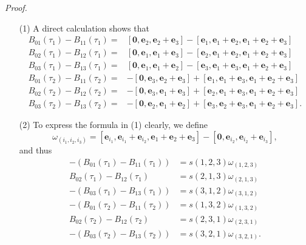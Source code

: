 \documentclass{article}
\begin{document}
\emph{Proof.}
\begin{enumerate}
\item[(1)]
  A direct calculation shows that
  \begin{align*}
    B_{01}(\tau_1) - B_{11}(\tau_1)
    =&
    [\mathbf{0}, \mathbf{e}_2, \mathbf{e}_2+\mathbf{e}_3]
      - [\mathbf{e}_1, \mathbf{e}_1+\mathbf{e}_2, \mathbf{e}_1+\mathbf{e}_2+\mathbf{e}_3] \\
    B_{02}(\tau_1) - B_{12}(\tau_1)
    =&
    [\mathbf{0}, \mathbf{e}_1, \mathbf{e}_1+\mathbf{e}_3]
      - [\mathbf{e}_2, \mathbf{e}_1+\mathbf{e}_2, \mathbf{e}_1+\mathbf{e}_2+\mathbf{e}_3] \\
    B_{03}(\tau_1) - B_{13}(\tau_1)
    =&
    [\mathbf{0}, \mathbf{e}_1, \mathbf{e}_1+\mathbf{e}_2]
      - [\mathbf{e}_3, \mathbf{e}_1+\mathbf{e}_3, \mathbf{e}_1+\mathbf{e}_2+\mathbf{e}_3] \\
    B_{01}(\tau_2) - B_{11}(\tau_2)
    =&
    -[\mathbf{0}, \mathbf{e}_3, \mathbf{e}_2+\mathbf{e}_3]
      + [\mathbf{e}_1, \mathbf{e}_1+\mathbf{e}_3, \mathbf{e}_1+\mathbf{e}_2+\mathbf{e}_3] \\
    B_{02}(\tau_2) - B_{12}(\tau_2)
    =& -[\mathbf{0}, \mathbf{e}_3, \mathbf{e}_1+\mathbf{e}_3]
      + [\mathbf{e}_2, \mathbf{e}_1+\mathbf{e}_3, \mathbf{e}_1+\mathbf{e}_2+\mathbf{e}_3] \\
    B_{03}(\tau_2) - B_{13}(\tau_2)
    =& -[\mathbf{0}, \mathbf{e}_2, \mathbf{e}_1+\mathbf{e}_2]
      + [\mathbf{e}_3, \mathbf{e}_2+\mathbf{e}_3, \mathbf{e}_1+\mathbf{e}_2+\mathbf{e}_3].
  \end{align*}

\item[(2)]
  To express the formula in (1) clearly, we define
  \[
    \omega_{(i_1,i_2,i_3)}
    =
    [
      \mathbf{e}_{i_1},
      \mathbf{e}_{i_1}+\mathbf{e}_{i_2},
      \mathbf{e}_{1}+\mathbf{e}_{2}+\mathbf{e}_{3}
    ]
    -
    [
      \mathbf{0},
      \mathbf{e}_{i_2},
      \mathbf{e}_{i_2}+\mathbf{e}_{i_3}
    ],
  \]
  and thus
  \begin{align*}
    -(B_{01}(\tau_1) - B_{11}(\tau_1)) &= s(1,2,3) \omega_{(1,2,3)} \\
    B_{02}(\tau_1) - B_{12}(\tau_1) &= s(2,1,3) \omega_{(2,1,3)} \\
    -(B_{03}(\tau_1) - B_{13}(\tau_1)) &= s(3,1,2) \omega_{(3,1,2)} \\
    -(B_{01}(\tau_2) - B_{11}(\tau_2)) &= s(1,3,2) \omega_{(1,3,2)} \\
    B_{02}(\tau_2) - B_{12}(\tau_2) &= s(2,3,1) \omega_{(2,3,1)} \\
    -(B_{03}(\tau_2) - B_{13}(\tau_2)) &= s(3,2,1) \omega_{(3,2,1)}.
  \end{align*}


\end{enumerate}
\end{document}
